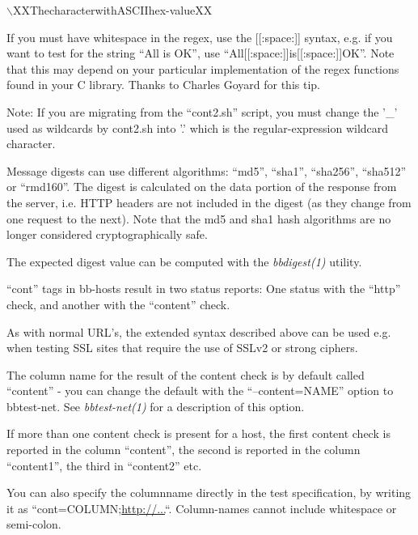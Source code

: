 \begin{description}
$\backslash$XXThecharacterwithASCIIhex-valueXX  



  If you must have whitespace in the regex, use the [[:space:]]
  syntax, e.g. if you want to test for the string ``All is OK'', use
  ``All[[:space:]]is[[:space:]]OK''. Note that this may depend on your
  particular implementation of the regex functions found in your C
  library. Thanks to Charles Goyard for this tip. 



  Note: If you are migrating from the ``cont2.sh'' script, you must
  change the '\_' used as wildcards by cont2.sh into '.' which is the
  regular-expression wildcard character. 



  Message digests can use different algorithms: ``md5'', ``sha1'',
  ``sha256'', ``sha512'' or ``rmd160''. The digest is calculated on
  the data portion of the response from the server, i.e. HTTP headers
  are not included in the digest (as they change from one request to
  the next). Note that the md5 and sha1 hash algorithms are no longer
  considered cryptographically safe. 



  The expected digest value can be computed with the \emph{bbdigest(1)}
 utility. 


  ``cont'' tags in bb-hosts result in two status reports: One status
  with the ``http'' check, and another with the ``content'' check. 



  As with normal URL's, the extended syntax described above can be
  used e.g. when testing SSL sites that require the use of SSLv2 or
  strong ciphers. 



  The column name for the result of the content check is by default
  called ``content'' - you can change the default with the
  ``--content=NAME'' option to bbtest-net. See \emph{bbtest-net(1)}
  for a description of this option. 



  If more than one content check is present for a host, the first
  content check is reported in the column ``content'', the second is
  reported in the column ``content1'', the third in ``content2'' etc. 



  You can also specify the columnname directly in the test
  specification, by writing it as
  ``cont=COLUMN;\url{http://...}``. Column-names cannot include
  whitespace or semi-colon. 




\end{description}
